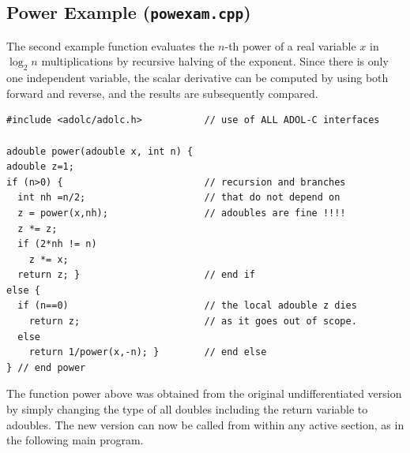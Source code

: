 \documentclass[11pt,twoside]{article}
\begin{document}
\subsection{Power Example ({\tt powexam.cpp})}
%
The second example function evaluates the $n$-th power of a real
variable $x$ in 
$\log_2 n$ multiplications by recursive halving of the exponent. Since
there is only one independent variable, the scalar derivative can be
computed by 
using both {\sf forward} and {\sf reverse}, and the
results are subsequently compared.
\begin{verbatim}
#include <adolc/adolc.h>           // use of ALL ADOL-C interfaces

adouble power(adouble x, int n) {
adouble z=1;
if (n>0) {                         // recursion and branches
  int nh =n/2;                     // that do not depend on
  z = power(x,nh);                 // adoubles are fine !!!!
  z *= z;
  if (2*nh != n) 
    z *= x;
  return z; }                      // end if
else {
  if (n==0)                        // the local adouble z dies
    return z;                      // as it goes out of scope.
  else 
    return 1/power(x,-n); }        // end else
} // end power
\end{verbatim}
The function {\sf power} above was obtained from the original 
undifferentiated version by simply changing the type of all 
{\sf double}s including the return variable to {\sf adouble}s. The new version
can now be called from within any active section, as in the following
main program. 
\end{document}
